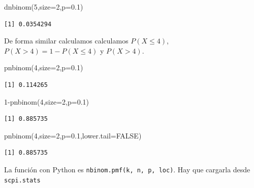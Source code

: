 \documentclass[
  letterpaper,
  DIV=11,
  numbers=noendperiod]{scrreprt}
\newenvironment{Shaded}{\begin{snugshade}}{\end{snugshade}}
\newcommand{\AttributeTok}[1]{\textcolor[rgb]{0.40,0.45,0.13}{#1}}
\newcommand{\ConstantTok}[1]{\textcolor[rgb]{0.56,0.35,0.01}{#1}}
\newcommand{\DecValTok}[1]{\textcolor[rgb]{0.68,0.00,0.00}{#1}}
\newcommand{\FloatTok}[1]{\textcolor[rgb]{0.68,0.00,0.00}{#1}}
\newcommand{\FunctionTok}[1]{\textcolor[rgb]{0.28,0.35,0.67}{#1}}
\newcommand{\NormalTok}[1]{\textcolor[rgb]{0.00,0.23,0.31}{#1}}
\newcommand{\SpecialCharTok}[1]{\textcolor[rgb]{0.37,0.37,0.37}{#1}}
\begin{document}
\begin{Shaded}
\begin{Highlighting}[]
\FunctionTok{dnbinom}\NormalTok{(}\DecValTok{5}\NormalTok{,}\AttributeTok{size=}\DecValTok{2}\NormalTok{,}\AttributeTok{p=}\FloatTok{0.1}\NormalTok{)}
\end{Highlighting}
\end{Shaded}

\begin{verbatim}
[1] 0.0354294
\end{verbatim}

De forma similar calculamos calculamos \(P(X\leq 4)\),
\(P(X>4)=1-P(X\leq 4)\) y \(P(X>4)\).

\begin{Shaded}
\begin{Highlighting}[]
\FunctionTok{pnbinom}\NormalTok{(}\DecValTok{4}\NormalTok{,}\AttributeTok{size=}\DecValTok{2}\NormalTok{,}\AttributeTok{p=}\FloatTok{0.1}\NormalTok{)}
\end{Highlighting}
\end{Shaded}

\begin{verbatim}
[1] 0.114265
\end{verbatim}

\begin{Shaded}
\begin{Highlighting}[]
\DecValTok{1}\SpecialCharTok{{-}}\FunctionTok{pnbinom}\NormalTok{(}\DecValTok{4}\NormalTok{,}\AttributeTok{size=}\DecValTok{2}\NormalTok{,}\AttributeTok{p=}\FloatTok{0.1}\NormalTok{)}
\end{Highlighting}
\end{Shaded}

\begin{verbatim}
[1] 0.885735
\end{verbatim}

\begin{Shaded}
\begin{Highlighting}[]
\FunctionTok{pnbinom}\NormalTok{(}\DecValTok{4}\NormalTok{,}\AttributeTok{size=}\DecValTok{2}\NormalTok{,}\AttributeTok{p=}\FloatTok{0.1}\NormalTok{,}\AttributeTok{lower.tail=}\ConstantTok{FALSE}\NormalTok{)}
\end{Highlighting}
\end{Shaded}

\begin{verbatim}
[1] 0.885735
\end{verbatim}

La función con Python es \texttt{nbinom.pmf(k,\ n,\ p,\ loc)}. Hay que
cargarla desde \texttt{scpi.stats}
\end{document}
